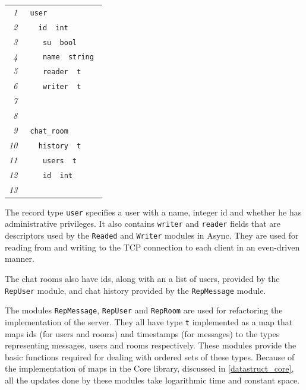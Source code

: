 \documentclass[12pt,twoside,notitlepage]{report}
\newcommand{\mlkeyword}[1]{\mbox{\color{red}{#1}}}
\newcommand{\mloperator}[1]{\mbox{\color{darkgreen}{#1}}}
\newcommand{\mlmodulename}[1]{\mbox{\color{navy}{#1}}}
\newcommand{\mlcodeline}[2]{\tiny\sl #1 & \begin{minipage}[c]{0.8\linewidth}\begin{alltt}\mbox{#2}\end{alltt}\end{minipage}\\}
\begin{document}
{ 
{\scriptsize\noindent\begin{longtable}{r|l}
\mlcodeline{1}{\mlkeyword{type}~user~\mlkeyword{=}
}
\mlcodeline{2}{~~\mloperator{\{}~id~\mloperator{\mbox{\COLON}}~int\mloperator{\mbox{\SC}}~~
}
\mlcodeline{3}{~~~~su~\mloperator{\mbox{\COLON}}~bool\mloperator{\mbox{\SC}}
}
\mlcodeline{4}{~~~~name~\mloperator{\mbox{\COLON}}~string\mloperator{\mbox{\SC}}
}
\mlcodeline{5}{~~~~reader~\mloperator{\mbox{\COLON}}~\mlmodulename{Reader}\mbox{}\mloperator{.}t\mloperator{\mbox{\SC}}
}
\mlcodeline{6}{~~~~writer~\mloperator{\mbox{\COLON}}~\mlmodulename{Writer}\mbox{}\mloperator{.}t\mloperator{\mbox{\SC}}
}
\mlcodeline{7}{~~\mloperator{\}}
}
\mlcodeline{8}{
}
\mlcodeline{9}{\mlkeyword{type}~chat\_{}room~\mlkeyword{=}~
}
\mlcodeline{10}{~~\mloperator{\{}~history~\mloperator{\mbox{\COLON}}~\mlmodulename{RepMessage}\mbox{}\mloperator{.}t\mloperator{\mbox{\SC}}
}
\mlcodeline{11}{~~~~users~\mloperator{\mbox{\COLON}}~\mlmodulename{RepUser}\mbox{}\mloperator{.}t\mloperator{\mbox{\SC}}
}
\mlcodeline{12}{~~~~id~\mloperator{\mbox{\COLON}}~int\mloperator{\mbox{\SC}}
}
\mlcodeline{13}{~~\mloperator{\}}}
\end{longtable}
}

The record type {\tt user} specifies a user with a name, integer id and whether he has administrative privileges. It also contains {\tt writer} and {\tt reader} fields that are descriptors used by the {\tt Readed} and {\tt Writer} modules in Async. They are used for reading from and writing to the TCP connection to each client in an even-driven manner.

The chat rooms also have ids, along with an a list of users, provided by the {\tt RepUser} module, and chat history provided by the {\tt RepMessage} module.

The modules {\tt RepMessage}, {\tt RepUser} and {\tt RepRoom} are used for refactoring the implementation of the server. They all have type {\tt t} implemented as a map that maps ids (for users and rooms) and timestamps (for messages) to the types representing messages, users and rooms respectively. These modules provide the basic functions required for dealing with ordered sets of these types. Because of the implementation of maps in the Core library, discussed in \ref{datastruct_core}, all the updates done by these modules take logarithmic time and constant space.     

}
\end{document}
